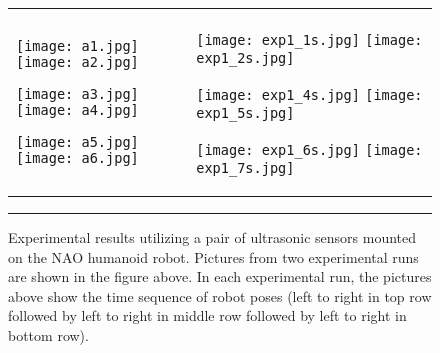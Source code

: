 \documentclass[10pt,conference]{ieeeconf}
\begin{document}
\begin{figure*}[!th]
%
  \begin{tabular}{p{3.2in}|p{3.2in}}
  \centerline{\texttt{[image: a1.jpg]}
  \texttt{[image: a2.jpg]}
} 
\vspace*{0.05in}
\centerline{\texttt{[image: a3.jpg]}
\texttt{[image: a4.jpg]}}
\vspace*{0.05in}
 \centerline{\texttt{[image: a5.jpg]}
  \texttt{[image: a6.jpg]}}
  \vspace*{-0.2in}
  &
  \centerline{\texttt{[image: exp1\_1s.jpg]}
  \texttt{[image: exp1\_2s.jpg]}
} 
\vspace*{0.05in}
\centerline{\texttt{[image: exp1\_4s.jpg]}
\texttt{[image: exp1\_5s.jpg]}}
\vspace*{0.05in}
 \centerline{\texttt{[image: exp1\_6s.jpg]}
  \texttt{[image: exp1\_7s.jpg]}}
  \vspace*{-0.2in}
\end{tabular}
    \caption{Experimental results utilizing a pair of ultrasonic sensors mounted
    on the NAO humanoid robot. Pictures from two experimental runs are shown in the figure above. In each experimental run, the pictures above show the time sequence of
    robot poses (left to right in top row followed by left to right in middle
    row followed by left to right in bottom row). 
  }
    \label{fig:nao_exp}
	\hrule
        \vspace*{-0.27in}
\end{figure*}
\end{document}

